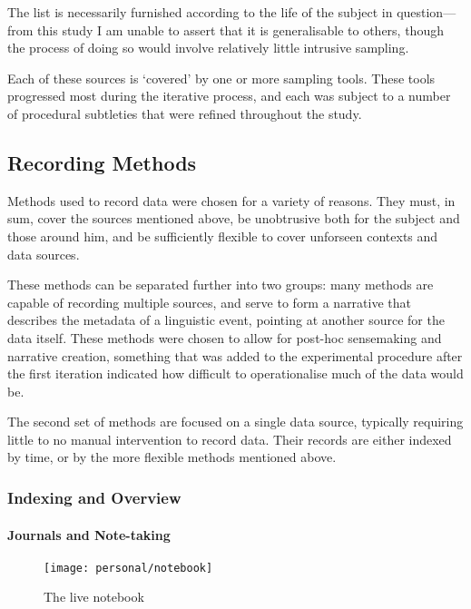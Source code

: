 The list is necessarily furnished according to the life of the subject in question---from this study I am unable to assert that it is generalisable to others, though the process of doing so would involve relatively little intrusive sampling.

Each of these sources is `covered' by one or more sampling tools.  These tools progressed most during the iterative process, and each was subject to a number of procedural subtleties that were refined throughout the study.










\subsection{Recording Methods}
Methods used to record data were chosen for a variety of reasons.  They must, in sum, cover the sources mentioned above, be unobtrusive both for the subject and those around him, and be sufficiently flexible to cover unforseen contexts and data sources.

These methods can be separated further into two groups: many methods are capable of recording multiple sources, and serve to form a narrative that describes the metadata of a linguistic event, pointing at another source for the data itself.  These methods were chosen to allow for post-hoc sensemaking and narrative creation, something that was added to the experimental procedure after the first iteration indicated how difficult to operationalise much of the data would be.

The second set of methods are focused on a single data source, typically requiring little to no manual intervention to record data.  Their records are either indexed by time, or by the more flexible methods mentioned above.


\subsubsection{Indexing and Overview}
\paragraph{Journals and Note-taking}

\begin{figure}[ht]
    \centering
    \texttt{[image: personal/notebook]}
    \caption{The live notebook}
    \label{fig:personal:online_notebook}
\end{figure}

